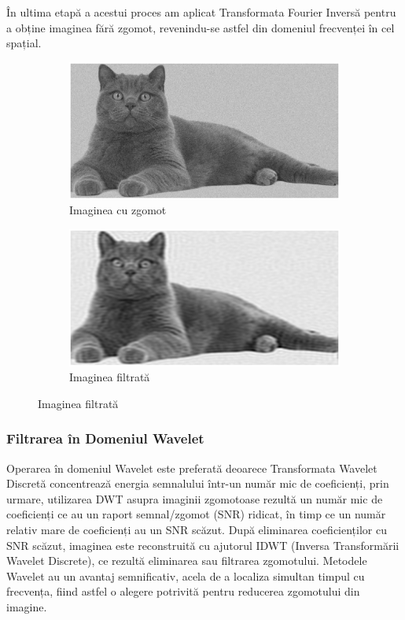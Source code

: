 \documentclass[12pt]{article}
\begin{document}
\indent În ultima etapă a acestui proces am aplicat Transformata Fourier Inversă pentru a obține imaginea fără zgomot, revenindu-se astfel din domeniul frecvenței în cel spațial.

\begin{figure}[h!]
    \begin{subfigure}{0.49\textwidth}
        \centering
        \includegraphics[width=1\textwidth]{images/noisy_image.eps}
        \caption{Imaginea cu zgomot}
        \label{fig:noisy_image}
    \end{subfigure}
    \hspace{10pt}
    \begin{subfigure}{0.49\textwidth}
        \centering
        \includegraphics[width=1\textwidth]{images/denoised_dft.eps}
        \caption{Imaginea filtrată}
        \label{fig:denoised_dft}
    \end{subfigure}
    \vspace{5pt}
\end{figure}

\subsubsection{Filtrarea în Domeniul Wavelet}
Operarea în domeniul Wavelet este preferată deoarece Transformata Wavelet Discretă concentrează energia semnalului într-un număr mic de coeficienți, prin urmare, utilizarea DWT asupra imaginii zgomotoase rezultă un număr mic de coeficienți ce au un raport semnal/zgomot (SNR) ridicat, în timp ce un număr relativ mare de coeficienți au un SNR scăzut. După eliminarea coeficienților cu SNR scăzut, imaginea este reconstruită cu ajutorul IDWT (Inversa Transformării Wavelet Discrete), ce rezultă eliminarea sau filtrarea zgomotului. Metodele Wavelet au un avantaj semnificativ, acela de a localiza simultan timpul cu frecvența, fiind astfel o alegere potrivită pentru reducerea zgomotului din imagine.
\end{document}

